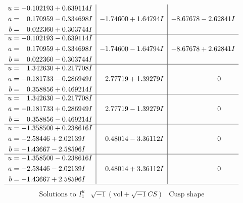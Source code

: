 \documentclass[1p]{elsarticle_modified}
\theoremstyle{definition}
\newcommand{\I}{\sqrt{-1}}
\begin{document}
$$\begin{array}{c|c|c}
\begin{aligned}
u &= -0.102193 + 0.639114 I \\
a &= \phantom{-}0.170959 - 0.334698 I \\
b &= \phantom{-}0.022360 + 0.303744 I\end{aligned}
 & -1.74600 + 1.64794 I & -8.67678 - 2.62841 I \\ \hline\begin{aligned}
u &= -0.102193 - 0.639114 I \\
a &= \phantom{-}0.170959 + 0.334698 I \\
b &= \phantom{-}0.022360 - 0.303744 I\end{aligned}
 & -1.74600 - 1.64794 I & -8.67678 + 2.62841 I \\ \hline\begin{aligned}
u &= \phantom{-}1.342630 + 0.217708 I \\
a &= -0.181733 - 0.286949 I \\
b &= \phantom{-}0.358856 + 0.469214 I\end{aligned}
 & \phantom{-}2.77719 + 1.39279 I & \phantom{-0.000000 } 0 \\ \hline\begin{aligned}
u &= \phantom{-}1.342630 - 0.217708 I \\
a &= -0.181733 + 0.286949 I \\
b &= \phantom{-}0.358856 - 0.469214 I\end{aligned}
 & \phantom{-}2.77719 - 1.39279 I & \phantom{-0.000000 } 0 \\ \hline\begin{aligned}
u &= -1.358500 + 0.238616 I \\
a &= -2.58446 + 2.02139 I \\
b &= -1.43667 - 2.58596 I\end{aligned}
 & \phantom{-}0.48014 - 3.36112 I & \phantom{-0.000000 } 0 \\ \hline\begin{aligned}
u &= -1.358500 - 0.238616 I \\
a &= -2.58446 - 2.02139 I \\
b &= -1.43667 + 2.58596 I\end{aligned}
 & \phantom{-}0.48014 + 3.36112 I & \phantom{-0.000000 } 0\\
 \hline 
 \end{array}$$\newpage$$\begin{array}{c|c|c}  
\text{Solutions to }I^u_{1}& \I (\text{vol} + \sqrt{-1}CS) & \text{Cusp shape}\\
 \hline 
\begin{aligned}

\end{aligned}
\end{array}$$
\end{document}
